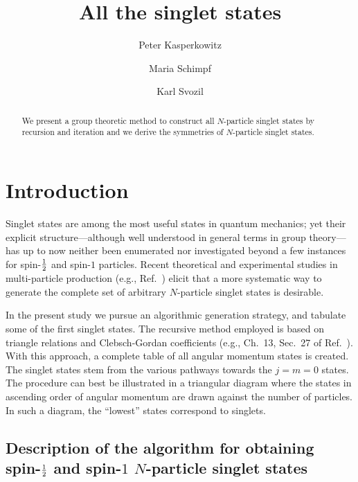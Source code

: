 \documentclass[pra,amsfonts,showpacs,preprint,showkeys]{revtex4}
\begin{document}
\title{All the singlet states}

\author{Peter Kasperkowitz}
\author{Maria Schimpf}
\author{Karl Svozil}


\begin{abstract}
We present a group theoretic method to construct all
$N$-particle singlet states by recursion and iteration and we
derive the symmetries of $N$-particle singlet states.
\end{abstract}



\maketitle


\section{Introduction}

Singlet states are among the most useful states in quantum
mechanics; yet their explicit structure---although well understood
in general terms in group theory---has up to now neither been
enumerated nor investigated beyond a few instances for
spin-${1\over 2}$ and spin-$1$ particles. Recent theoretical and
experimental studies in multi-particle production (e.g.,
Ref.~\cite{egbkzw}) elicit that a more systematic way to generate
the complete set of arbitrary $N$-particle singlet states is desirable.

In the present study we pursue an algorithmic generation strategy,
and tabulate some of the first singlet states. The recursive
method employed is based on triangle relations and
Clebsch-Gordan coefficients (e.g., Ch.~13, Sec.~27 of
Ref.~\cite{messiah-62}). With this approach, a complete table of
all angular momentum states is created. The singlet states stem
from the various pathways towards the $j= m=0$ states. The
procedure can best be illustrated in a triangular diagram where
the states in ascending order of angular momentum are drawn against the number
of particles. In such a diagram, the ``lowest'' states correspond
to singlets.




\subsection{Description of the algorithm for obtaining spin-${1\over 2}$ and spin-$1$ $N$-particle singlet states}
\end{document}
